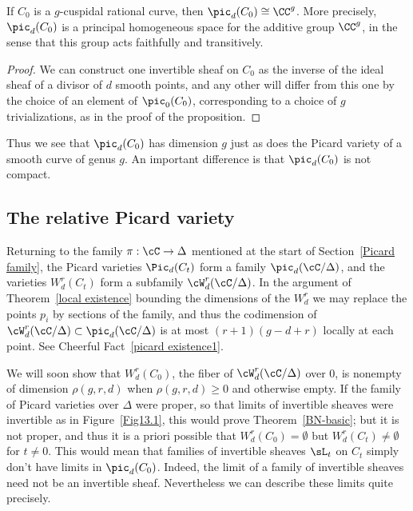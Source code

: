 \begin{corollary}
If $C_{0}$ is a $g$-cuspidal rational curve, then $\pic_{d}(C_{0})
\cong \CC^{g}$. More precisely,
%
$\pic_{d}(C_{0})$ is a principal homogeneous space for the additive
group $\CC^{g}$, in the sense that
this group acts faithfully and transitively.
\unif
\end{corollary}

\begin{proof}
We can construct one invertible sheaf on $C_{0}$ as the inverse of the
ideal sheaf of a divisor of $d$ smooth points, and any other will differ
from this one by the choice of an element of $\pic_{0}(C_{0})$,
corresponding to a choice of $g$ trivializations, as in the proof of
the proposition. 
\unif
\end{proof}

Thus we see that $\pic_{d}(C_{0})$ has dimension $g$ just as does the
Picard variety
%
of a smooth curve
of genus $g$. An important difference is that $\pic_{d}(C_{0})$ is
not compact.

\subsection*{The relative Picard variety}

Returning to the family $\pi : \cC \to \Delta$ mentioned at the
start
% 
of
Section~\ref{Picard family}, the Picard varieties $\Pic_d(C_t)$ form
a family $\pic_d(\cC/\Delta)$, and the varieties $W^r_d(C_t)$ form a
subfamily $\cW^r_d(\cC/\Delta)$.  In the argument
of Theorem~\ref{local existence} bounding  the dimensions of the $W^r_d$
we may replace the points $p_i$ by sections of the family, and thus
the codimension of $\cW^r_d(\cC/\Delta) \subset \pic_d(\cC/\Delta)$
is 
at most
$(r+1)(g-d+r)$ locally at each point. See
Cheerful Fact~\ref{picard existence1}.

We will soon show that $W^{r}_{d}(C_{0})$, the fiber of
$\cW^{r}_{d}(\cC/\Delta)$ over 0,  is nonempty of dimension $\rho(g,r,d)$
when $\rho(g,r,d)\geq 0$ and otherwise empty. If the family of Picard
varieties over $\Delta$ were proper, so that limits of invertible sheaves
were invertible as in Figure~\ref{Fig13.1},
this would prove Theorem~\ref{BN-basic}; but it is not proper, and
thus it is a priori possible that $W^{r}_{d}(C_{0})=\emptyset$ but
$W^{r}_{d}(C_{t})\neq \emptyset$ for $t\neq 0$. This would mean that
families of invertible sheaves $\sL_{t}$ on $C_{t}$  simply don't
have  limits
in $\pic_{d}(C_{0})$. Indeed, the limit of a family of invertible sheaves
need not be an invertible
sheaf. Nevertheless we can describe these limits quite precisely.

